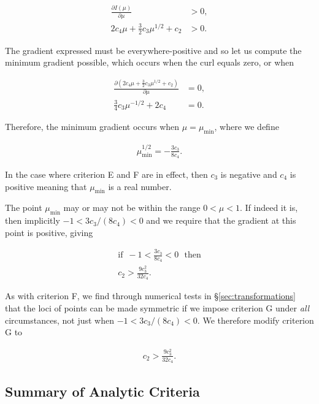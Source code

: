 \begin{align}
\frac{ \partial I(\mu) }{\partial \mu } &> 0,\nonumber\\
2 c_4 \mu + \frac{3}{2} c_3 \mu^{1/2} + c_2 &> 0.
\end{align}

The gradient expressed must be everywhere-positive and so let us compute
the minimum gradient possible, which occurs when the curl equals zero, or
when

\begin{align}
\frac{\partial (2 c_4 \mu + \frac{3}{2} c_3 \mu^{1/2} + c_2) }{ \partial \mu } &= 0,\nonumber\\
\frac{3}{4} c_3 \mu^{-1/2} + 2 c_4 &= 0.
\end{align}

Therefore, the minimum gradient occurs when $\mu=\mu_{\mathrm{min}}$, where we 
define

\begin{align}
\mu_{\mathrm{min}}^{1/2} = -\frac{3c_3}{8c_4}.
\end{align}

In the case where criterion E and F are in effect, then $c_3$ is negative and 
$c_4$ is positive meaning that $\mu_{\mathrm{min}}$ is a real number.

The point $\mu_{\mathrm{min}}$ may or may not be within the range $0<\mu<1$. If 
indeed it is, then implicitly $-1 < 3 c_3/(8 c_4) < 0$ and we require that 
the gradient at this point is positive, giving

\begin{align}
\mathrm{if}\,\,\,-1 < \frac{3 c_3}{8 c_4} < 0\,\mathrm{\,\,\,then}\nonumber\\
c_2 > \frac{9 c_3^2}{32 c_4}.
\end{align}

As with criterion F, we find through numerical tests in 
\S\ref{sec:transformations} that the loci of points can be made symmetric if we 
impose criterion G under \textit{all} circumstances, not just when 
$-1 < 3 c_3/(8 c_4) < 0$. We therefore modify criterion G to

\begin{align}
c_2 > \frac{9 c_3^2}{32 c_4}.
\label{eqn:criterionG}
\end{align}

\subsection{Summary of Analytic Criteria}
\label{sub:summaryofcriteria}


